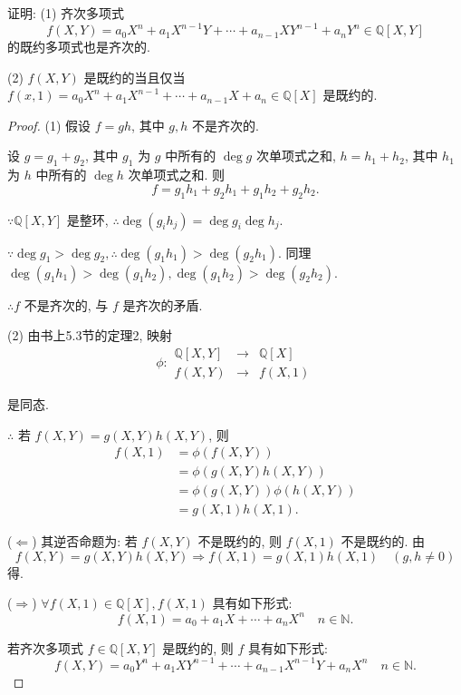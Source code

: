 \documentclass[UTF8]{ctexart}
\begin{document}
\begin{exercise}%
    证明: (1) 齐次多项式
    \[f(X,Y)=a_0X^n+a_1X^{n-1}Y+\cdots+a_{n-1}XY^{n-1}+a_nY^n\in\mathbb{Q}[X,Y]\]
    的既约多项式也是齐次的.
    
    (2) $f(X,Y)$ 是既约的当且仅当 $f(x,1)=a_0X^n+a_1X^{n-1}+\cdots+a_{n-1}X+a_n\in\mathbb{Q}[X]$ 是既约的.
\end{exercise}
\begin{proof}
    (1) 假设 $f=gh$, 其中 $g,h$ 不是齐次的.

    设 $g=g_1+g_2$, 其中 $g_1$ 为 $g$ 中所有的 $\deg g$ 次单项式之和, $h=h_1+h_2$, 其中 $h_1$ 为 $h$ 中所有的 $\deg h$ 次单项式之和. 则
    \[f=g_1h_1+g_2h_1+g_1h_2+g_2h_2.\]

    $\because\mathbb{Q}[X,Y]$ 是整环, $\therefore\deg(g_ih_j)=\deg g_i\deg h_j$.
    
    $\because\deg g_1>\deg g_2,\therefore\deg(g_1h_1)>\deg(g_2h_1)$. 同理 $\deg(g_1h_1)>\deg(g_1h_2),\deg(g_1h_2)>\deg(g_2h_2)$.

    $\therefore f$ 不是齐次的, 与 $f$ 是齐次的矛盾.

    (2) 由书上5.3节的定理2, 映射
    \[\phi:\begin{array}{rcl}
        \mathbb{Q}[X,Y] & \to & \mathbb{Q}[X] \\
        f(X,Y) & \to & f(X,1)
    \end{array}\]

    是同态.

    $\therefore$ 若 $f(X,Y)=g(X,Y)h(X,Y)$, 则
    \begin{align*}
        f(X,1) & =\phi(f(X,Y)) \\
        & =\phi(g(X,Y)h(X,Y)) \\
        & =\phi(g(X,Y))\phi(h(X,Y)) \\
        & =g(X,1)h(X,1).
    \end{align*}

    ($\Leftarrow$) 其逆否命题为: 若 $f(X,Y)$ 不是既约的, 则 $f(X,1)$ 不是既约的. 由
    \[f(X,Y)=g(X,Y)h(X,Y)\Rightarrow f(X,1)=g(X,1)h(X,1)\quad(g,h\neq0)\]
    得.
    
    ($\Rightarrow$) $\forall f(X,1)\in\mathbb{Q}[X],f(X,1)$ 具有如下形式:
    \begin{equation}\label{eq4.4}
        f(X,1)=a_0+a_1X+\cdots+a_nX^n\quad n\in\mathbb{N}.
    \end{equation}

    若齐次多项式 $f\in\mathbb{Q}[X,Y]$ 是既约的, 则 $f$ 具有如下形式:
    \begin{equation}\label{eq4.5}
        f(X,Y)=a_0Y^n+a_1XY^{n-1}+\cdots+a_{n-1}X^{n-1}Y+a_nX^n\quad n\in\mathbb{N}.
    \end{equation}


\end{proof}
\end{document}
